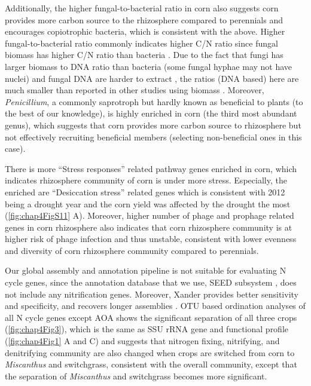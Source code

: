\documentclass[]{msu-thesis}
\begin{document}
Additionally, the higher fungal-to-bacterial ratio in corn also suggests
corn provides more carbon source to the rhizosphere compared to
perennials and encourages copiotrophic bacteria, which is consistent
with the above. Higher fungal-to-bacterial ratio commonly indicates
higher C/N ratio since fungal biomass has higher C/N ratio than bacteria
\cite{de_vries_fungal/bacterial_2006,waring_differences_2013}. Due to
the fact that fungi has larger biomass to DNA ratio than bacteria (some
fungal hyphae may not have nuclei) and fungal DNA are harder to extract
\cite{muller_rapid_1998}, the ratios (DNA based) here are much smaller
than reported in other studies using biomass
\cite{jesus_influence_2015}. Moreover, \textit{Penicillium}, a commonly
saprotroph but hardly known as beneficial to plants (to the best of our
knowledge), is highly enriched in corn (the third most abundant genus),
which suggests that corn provides more carbon source to rhizosphere but
not effectively recruiting beneficial members (selecting non-beneficial
ones in this case).

There is more ``Stress responses'' related pathway genes enriched in
corn, which indicates rhizosphere community of corn is under more
stress. Especially, the enriched are ``Desiccation stress'' related
genes which is consistent with 2012 being a drought year and the corn
yield was affected by the drought the most (\cref{fig:chap4FigS11} A).
Moreover, higher number of phage and prophage related genes in corn
rhizosphere also indicates that corn rhizosphere community is at higher
risk of phage infection and thus unstable, consistent with lower
evenness and diversity of corn rhizosphere community compared to
perennials.

Our global assembly and annotation pipeline is not suitable for
evaluating N cycle genes, since the annotation database that we use,
SEED subsystem \cite{meyer_metagenomics_2008}, does not include any
nitrification genes. Moreover, Xander provides better sensitivity and
specificity, and recovers longer assemblies \cite{wang_xander:_2015}. OTU
based ordination analyses of all N cycle genes except AOA shows the
significant separation of all three crops (\cref{fig:chap4Fig3}), which is
the same as SSU rRNA gene and functional profile (\cref{fig:chap4Fig1} A
and C) and suggests that nitrogen fixing, nitrifying, and denitrifying
community are also changed when crops are switched from corn to
\textit{Miscanthus} and switchgrass, consistent with the overall
community, except that the separation of \textit{Miscanthus} and
switchgrass becomes more significant.
\end{document}
